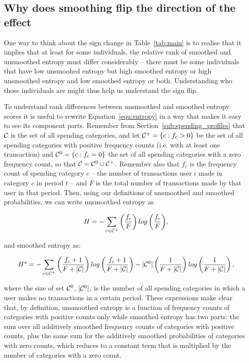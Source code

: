\subsection{Why does smoothing flip the direction of the effect}%
\label{sub:why_does_smoothing_flip_the_direction_of_the_effect}

One way to think about the sign change in Table~\ref{tab:main}
is to realise that it implies that at least for some individuals, the relative
rank of smoothed and unsmoothed entropy must differ considerably -- there must
be some individuals that have low unsmoohed entropy but high smoothed entropy
or high unsmoothed entropy and low smoothed entropy or both. Understanding who
those individuals are might thus help us understand the sign flip.

To understand rank differences between unsmoothed and smoothed entropy scores
it is useful to rewrite Equation~\ref{equ:entropy} in a way that makes it easy
to see its component parts. Remember from Section~\ref{sub:spending_profiles}
that $\mathcal{C}$ is the set of all spending categories, and let $\mathcal{C}^{+} = \{c: f_c
> 0\}$ be the set of all spending categories with positive frequency counts
(i.e.  with at least one transaction) and $\mathcal{C}^{0} = \{c: f_c = 0\}$ the set of
all spending categories with a zero frequency count, so that $\mathcal{C} = \mathcal{C}^{0}
\cup \mathcal{C}^{+}$. Remember also that $f_c$ is the frequency count of spending
category $c$ -- the number of transactions user $i$ made in category $c$ in
period $t$ -- and $F$ is the total number of transactions made by that user in
that period. Then, using our definitions of unsmoothed and smoothed
probabilities, we can write unsmoothed entropy as

\begin{equation}
\label{equ:entropy_us}
H = -\sum_{c \in \mathcal{C}^{+}}{\left(\frac{f_c}{F}\right)
log\left(\frac{f_c}{F}\right)},
\end{equation}

and smoothed entropy as:

\begin{equation}
\label{equ:entropy_s}
H^s = -\sum_{c \in \mathcal{C}^{+}}{\left(\frac{f_c + 1}{F + |\mathcal{C}|}\right)
log\left(\frac{f_c + 1}{F + |\mathcal{C}|}\right)}
- |\mathcal{C}^{0}|\left(\frac{1}{F + |\mathcal{C}|}\right)
log\left(\frac{1}{F + |\mathcal{C}|}\right),
\end{equation}

\noindent where the size of set $\mathcal{C}^{0}$, $|\mathcal{C}^{0}|$, is the number of all
spending categories in which a user makes no transactions in a certain period.
These expressions make clear that, by definition, unsmoothed entropy is a
function of frequency counts of categories with positive counts only while
smoothed entropy has two parts: the sum over all additively smoothed frequency
counts of categories with positive counts, plus the same sum for the additively
smoothed probabilities of categories with zero counts, which reduces to a
constant term that is multiplied by the number of categories with a zero count.

